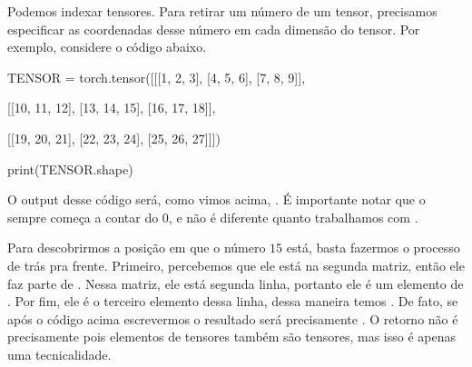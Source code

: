 \documentclass{article}
\begin{document}
Podemos indexar tensores. Para retirar um número de um tensor, precisamos especificar as coordenadas desse número em cada dimensão do tensor. Por exemplo, considere o código abaixo. \begin{python}
TENSOR = torch.tensor([[[1, 2, 3],
                        [4, 5, 6],
                        [7, 8, 9]],
                        
                       [[10, 11, 12],
                        [13, 14, 15],
                        [16, 17, 18]],
                        
                       [[19, 20, 21],
                        [22, 23, 24],
                        [25, 26, 27]]])

print(TENSOR.shape)
\end{python}

O output desse código será, como vimos acima, . É importante notar que o  sempre começa a contar do $0$, e não é diferente quanto trabalhamos com .

Para descobrirmos a posição em que o número $15$ está, basta fazermos o processo de trás pra frente. Primeiro, percebemos que ele está na segunda matriz, então ele faz parte de . Nessa matriz, ele está segunda linha, portanto ele é um elemento de . Por fim, ele é o terceiro elemento dessa linha, dessa maneira temos . De fato, se após o código acima escrevermos  o resultado será precisamente . O retorno não é precisamente  pois elementos de tensores também são tensores, mas isso é apenas uma tecnicalidade.
\end{document}
